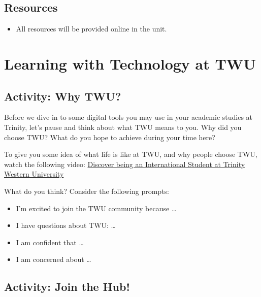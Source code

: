 \documentclass[
]{book}
\providecommand{\tightlist}{%
  \setlength{\itemsep}{0pt}\setlength{\parskip}{0pt}}
\theoremstyle{definition}
\theoremstyle{definition}
\theoremstyle{definition}
\theoremstyle{definition}
\theoremstyle{remark}
\begin{document}
\hypertarget{resources}{%
\subsection*{Resources}\label{resources}}

\begin{itemize}
\tightlist
\item
  All resources will be provided online in the unit.
\end{itemize}

\hypertarget{learning-with-technology-at-twu}{%
\section{Learning with Technology at TWU}\label{learning-with-technology-at-twu}}

\hypertarget{activity-why-twu}{%
\subsection*{Activity: Why TWU?}\label{activity-why-twu}}

\begin{reflect}
Before we dive in to some digital tools you may use in your academic studies at Trinity, let's pause and think about what TWU means to you. Why did you choose TWU? What do you hope to achieve during your time here?

To give you some idea of what life is like at TWU, and why people choose TWU, watch the following video: \href{https://www.youtube.com/watch?v=VkyZjv3ZbXg}{Discover being an International Student at Trinity Western University}

What do you think? Consider the following prompts:

\begin{itemize}
\tightlist
\item
  I'm excited to join the TWU community because \ldots{}
\item
  I have questions about TWU: \ldots{}
\item
  I am confident that \ldots{}
\item
  I am concerned about \ldots{}
\end{itemize}
\end{reflect}

\hypertarget{activity-join-the-hub}{%
\subsection*{Activity: Join the Hub!}\label{activity-join-the-hub}}
\end{document}
